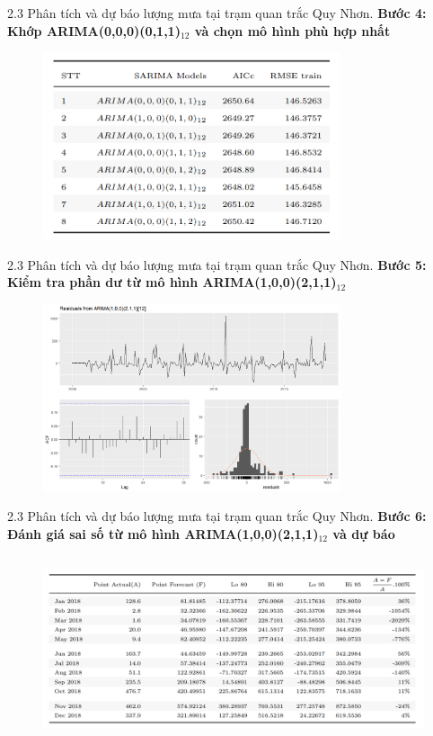 \documentclass[notheorems,envcountsect,hyperref=unicode]{beamer}
\begin{document}
\begin{frame}{2.3 Phân tích và dự báo lượng mưa tại trạm quan trắc Quy Nhơn.}
	\textbf{Bước 4: Khớp  ARIMA(0,0,0)(0,1,1)$_{12}$ và chọn mô hình phù hợp nhất}\\
	\begin{figure}[!htb]
		\centering
		\includegraphics[width=1\linewidth,height=5.5cm]{duong8} 
	\end{figure}
\end{frame}

\begin{frame}{2.3 Phân tích và dự báo lượng mưa tại trạm quan trắc Quy Nhơn.}
	\textbf{Bước 5: Kiểm tra phần dư từ mô hình ARIMA(1,0,0)(2,1,1)$_{12}$}\\
	\begin{figure}[!htb]
		\centering
		\includegraphics[width=1\linewidth,height=5.5cm]{V7} 
	\end{figure}
\end{frame}

\begin{frame}{2.3 Phân tích và dự báo lượng mưa tại trạm quan trắc Quy Nhơn.}
	\textbf{Bước 6: Đánh giá sai số từ mô hình ARIMA(1,0,0)(2,1,1)$_{12}$ và dự báo}\\
	\begin{figure}[!htb]
		\centering
		\includegraphics[width=1\linewidth,height=5.5cm]{duong9} 
	\end{figure}
\end{frame}
\end{document}
